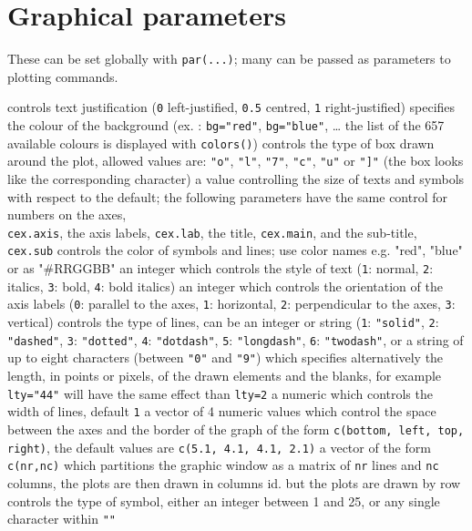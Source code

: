 \section{Graphical parameters}{These can be set globally with
{\tt par(...)}; many can be passed as
parameters to plotting commands.}


	{controls text justification ({\tt 0} left-justified, {\tt 0.5} centred, {\tt 1} right-justified)}
	{specifies the colour of the background (ex. : {\tt bg="red"}, {\tt bg="blue"}, \ldots{} the list of the 657 available colours is displayed with {\tt colors()})}
	{controls the type of box drawn around the plot, allowed values
    are: {\tt "o"}, {\tt "l"}, {\tt "7"}, {\tt "c"}, {\tt "u"} or {\tt "]"} (the box looks like the corresponding character)}
	{ a value controlling the size of texts and symbols with respect to the default; the following parameters have the same control for numbers on the axes,\\
    {\tt cex.axis}, the axis labels, {\tt cex.lab}, the title, {\tt cex.main},
    and the sub-title, {\tt cex.sub}}
	{controls the color of symbols and lines; use color names e.g. "red", "blue" or as "\#RRGGBB"}
	{an integer which controls the style of text ({\tt 1}: normal, {\tt 2}: italics, {\tt 3}: bold, {\tt 4}: bold italics)}
	{ an integer which controls the orientation of the axis labels ({\tt 0}: parallel to the axes, {\tt 1}: horizontal, {\tt 2}: perpendicular to the axes, {\tt 3}: vertical)}
	{controls the type of lines, can be an integer or string ({\tt 1}: {\tt "solid"}, {\tt 2}: {\tt "dashed"}, {\tt 3}: {\tt "dotted"}, {\tt 4}: {\tt "dotdash"}, {\tt 5}: {\tt "longdash"}, {\tt 6}: {\tt "twodash"}, or a string of up to eight characters (between {\tt "0"} and {\tt "9"}) which specifies alternatively the length, in points or pixels, of the drawn elements and the blanks, for example {\tt lty="44"} will have the same effect than {\tt lty=2}}
	{ a numeric which controls the width of lines, default {\tt 1}}
	{ a vector of 4 numeric values which control the space between the axes and the border of the graph of the form {\tt c(bottom, left, top, right)}, the default values are {\tt c(5.1, 4.1, 4.1, 2.1)}}
	{a vector of the form {\tt c(nr,nc)} which partitions the graphic window as a matrix of {\tt nr} lines and {\tt nc} columns, the plots are then drawn in columns}
	{ id. but the plots are drawn by row}
	{ controls the type of symbol, either an integer between 1 and 25, or any single character within {\tt ""}}

